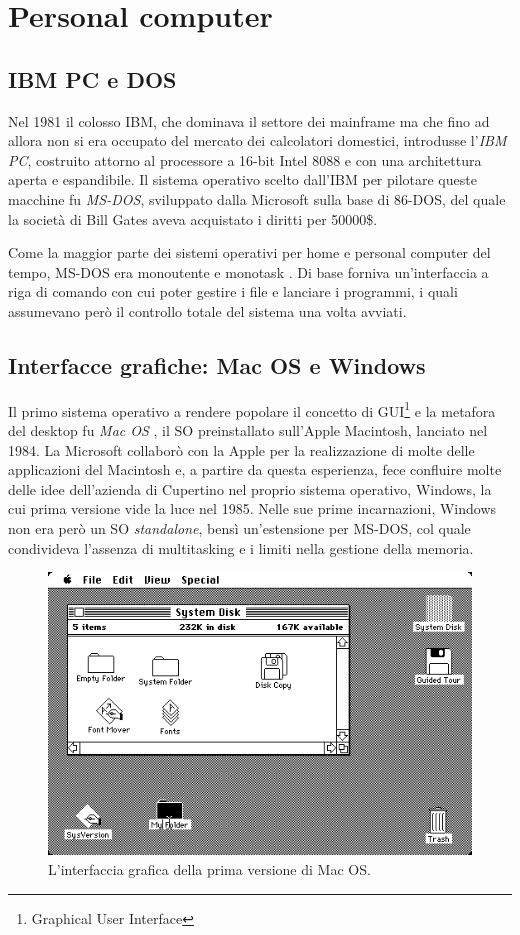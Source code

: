 \documentclass[12pt,a4paper]{report}
\begin{document}
	\section{Personal computer}
		\subsection{IBM PC e DOS}
			Nel 1981 il colosso IBM, che dominava il settore dei mainframe ma che fino ad allora non si era occupato del mercato
			dei calcolatori domestici, introdusse l'\emph{IBM PC}, costruito attorno al processore a 16-bit Intel 8088 e con una
			architettura aperta e espandibile. Il sistema operativo scelto dall'IBM per pilotare queste macchine fu \emph{MS-DOS}, sviluppato
			dalla Microsoft sulla base di 86-DOS, del quale la società di Bill Gates aveva acquistato i diritti per 50000\$.
		
			Come la maggior parte dei sistemi operativi per home e personal computer del tempo, MS-DOS era monoutente
			e monotask \cite{WIKI_MS-DOS}. Di base forniva un'interfaccia a riga di comando con cui poter gestire i file
			e lanciare i programmi, i quali assumevano però il controllo totale del sistema una volta avviati.
			
		\subsection{Interfacce grafiche: Mac OS e Windows}
			Il primo sistema operativo a rendere popolare il concetto di GUI\footnote{Graphical User Interface} e la metafora del desktop
			fu \emph{Mac OS} \cite{WIKI_MacHistory}, il SO preinstallato sull'Apple Macintosh, lanciato nel 1984.
			La Microsoft collaborò con la Apple per la realizzazione di molte delle applicazioni del Macintosh e, a partire da questa
			esperienza, fece confluire molte delle idee dell'azienda di Cupertino nel proprio sistema operativo, Windows, la cui
			prima versione vide la luce nel 1985.
			Nelle sue prime incarnazioni, Windows non era però un SO \emph{standalone}, bensì un'estensione per MS-DOS,
			col quale condivideva l'assenza di multitasking e i limiti nella gestione della memoria.
	
			\begin{figure}[htbp]
			\centering
			\includegraphics[scale=0.6]{img/macos.png}
			\caption{L'interfaccia grafica della prima versione di Mac OS.\label{fig:macos}}
			\end{figure}
			
\end{document}
